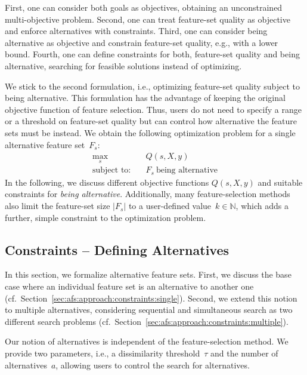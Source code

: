 \documentclass{article}
\theoremstyle{definition}
\begin{document}
First, one can consider both goals as objectives, obtaining an unconstrained multi-objective problem.
Second, one can treat feature-set quality as objective and enforce alternatives with constraints.
Third, one can consider being alternative as objective and constrain feature-set quality, e.g., with a lower bound.
Fourth, one can define constraints for both, feature-set quality and being alternative, searching for feasible solutions instead of optimizing.

We stick to the second formulation, i.e., optimizing feature-set quality subject to being alternative.
This formulation has the advantage of keeping the original objective function of feature selection.
Thus, users do not need to specify a range or a threshold on feature-set quality but can control how alternative the feature sets must be instead.
We obtain the following optimization problem for a single alternative feature set~$F_s$:
%
\begin{equation}
	\begin{aligned}
		\max_s &\quad Q(s,X,y) \\
		\text{subject to:} &\quad F_s~\text{being alternative}
	\end{aligned}
	\label{eq:afs:afs-general}
\end{equation}
%
In the following, we discuss different objective functions $Q(s,X,y)$ and suitable constraints for \emph{being alternative}.
Additionally, many feature-selection methods also limit the feature-set size $|F_s|$ to a user-defined value~$k \in \mathbb{N}$, which adds a further, simple constraint to the optimization problem.

\subsection{Constraints -- Defining Alternatives}
\label{sec:afs:approach:constraints}

In this section, we formalize alternative feature sets.
First, we discuss the base case where an individual feature set is an alternative to another one (cf.~Section~\ref{sec:afs:approach:constraints:single}).
Second, we extend this notion to multiple alternatives, considering sequential and simultaneous search as two different search problems (cf.~Section~\ref{sec:afs:approach:constraints:multiple}).

Our notion of alternatives is independent of the feature-selection method.
We provide two parameters, i.e., a dissimilarity threshold~$\tau$ and the number of alternatives~$a$, allowing users to control the search for alternatives.
\end{document}
